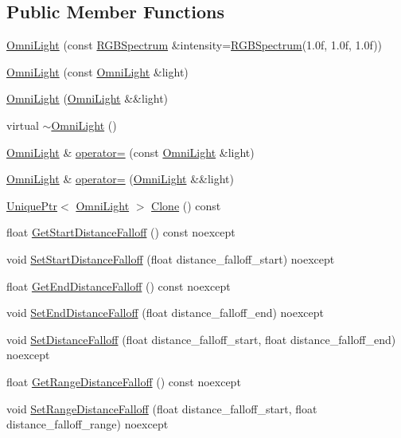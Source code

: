 \subsection*{Public Member Functions}
\begin{DoxyCompactItemize}
\item 
\hyperlink{classmage_1_1_omni_light_a94794dd7c19fcac0c0d0b9d83108513b}{Omni\+Light} (const \hyperlink{structmage_1_1_r_g_b_spectrum}{R\+G\+B\+Spectrum} \&intensity=\hyperlink{structmage_1_1_r_g_b_spectrum}{R\+G\+B\+Spectrum}(1.\+0f, 1.\+0f, 1.\+0f))
\item 
\hyperlink{classmage_1_1_omni_light_accf10bcdf8ed523cfb04129f5345ef92}{Omni\+Light} (const \hyperlink{classmage_1_1_omni_light}{Omni\+Light} \&light)
\item 
\hyperlink{classmage_1_1_omni_light_ae0353cedc67d88be2f4b88374482933d}{Omni\+Light} (\hyperlink{classmage_1_1_omni_light}{Omni\+Light} \&\&light)
\item 
virtual \hyperlink{classmage_1_1_omni_light_af6f4921499b430041966f38aac920b69}{$\sim$\+Omni\+Light} ()
\item 
\hyperlink{classmage_1_1_omni_light}{Omni\+Light} \& \hyperlink{classmage_1_1_omni_light_a7bdce151d327daef5e1f31daedcc4627}{operator=} (const \hyperlink{classmage_1_1_omni_light}{Omni\+Light} \&light)
\item 
\hyperlink{classmage_1_1_omni_light}{Omni\+Light} \& \hyperlink{classmage_1_1_omni_light_a287a54dede61e65efe4493ec20531428}{operator=} (\hyperlink{classmage_1_1_omni_light}{Omni\+Light} \&\&light)
\item 
\hyperlink{namespacemage_a3316d7143a973e37adf1110f2e80ca31}{Unique\+Ptr}$<$ \hyperlink{classmage_1_1_omni_light}{Omni\+Light} $>$ \hyperlink{classmage_1_1_omni_light_a82325924de65733314dcf2b87e926d60}{Clone} () const
\item 
float \hyperlink{classmage_1_1_omni_light_adb7811b447e8b4679b21123c01c6d6fb}{Get\+Start\+Distance\+Falloff} () const noexcept
\item 
void \hyperlink{classmage_1_1_omni_light_ac7d7dbdbaf9abdc6ee3c660d2354c39d}{Set\+Start\+Distance\+Falloff} (float distance\+\_\+falloff\+\_\+start) noexcept
\item 
float \hyperlink{classmage_1_1_omni_light_a1bd4d9eb6a22ae78e1780f142039611c}{Get\+End\+Distance\+Falloff} () const noexcept
\item 
void \hyperlink{classmage_1_1_omni_light_a976808d30573076afcb847724717a121}{Set\+End\+Distance\+Falloff} (float distance\+\_\+falloff\+\_\+end) noexcept
\item 
void \hyperlink{classmage_1_1_omni_light_ad46e519eae108d009c8b77b86d302ed1}{Set\+Distance\+Falloff} (float distance\+\_\+falloff\+\_\+start, float distance\+\_\+falloff\+\_\+end) noexcept
\item 
float \hyperlink{classmage_1_1_omni_light_a6f70a9cca052fa2228aeab4c44ca8a0b}{Get\+Range\+Distance\+Falloff} () const noexcept
\item 
void \hyperlink{classmage_1_1_omni_light_a38d8a72fa7db770547a09f69f5463007}{Set\+Range\+Distance\+Falloff} (float distance\+\_\+falloff\+\_\+start, float distance\+\_\+falloff\+\_\+range) noexcept
\end{DoxyCompactItemize}
